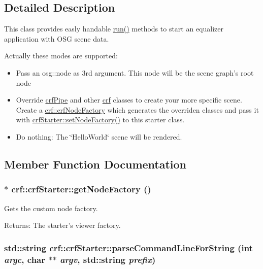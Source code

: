 \subsection{Detailed Description}
This class provides easly handable \hyperlink{a00007_bff219a07f93750e4e6db09fd026de7f}{run()} methods to start an equalizer application with OSG scene data. 

Actually these modes are supported: \begin{itemize}
\item Pass an osg::node as 3rd argument. This node will be the scene graph's root node \item Override \hyperlink{a00006}{crfPipe} and other \hyperlink{a00043}{crf} classes to create your more specific scene. Create a \hyperlink{a00005}{crf::crfNodeFactory} which generates the overriden classes and pass it with \hyperlink{a00007_317832b54784e7c2c21f5d6bda17cda3}{crfStarter::setNodeFactory()} to this starter class. \item Do nothing: The \char`\"{}HelloWorld\char`\"{} scene will be rendered.\end{itemize}


\subsection{Member Function Documentation}
\hypertarget{a00007_6b14742d2d820eba786626ab044c7cbd}{
\subsubsection[{getNodeFactory}]{$\ast$ crf::crfStarter::getNodeFactory ()}}
\label{a00007_6b14742d2d820eba786626ab044c7cbd}


Gets the custom node factory. 

\begin{Desc}
\item[Returns:]The starter's viewer factory. \end{Desc}
\hypertarget{a00007_b74ff2cc944f29fb91262ab5a9fa084a}{
\subsubsection[{parseCommandLineForString}]{\setlength{\rightskip}{0pt plus 5cm}std::string crf::crfStarter::parseCommandLineForString (int {\em argc}, \/  char $\ast$$\ast$ {\em argv}, \/  std::string {\em prefix})}}
\label{a00007_b74ff2cc944f29fb91262ab5a9fa084a}


